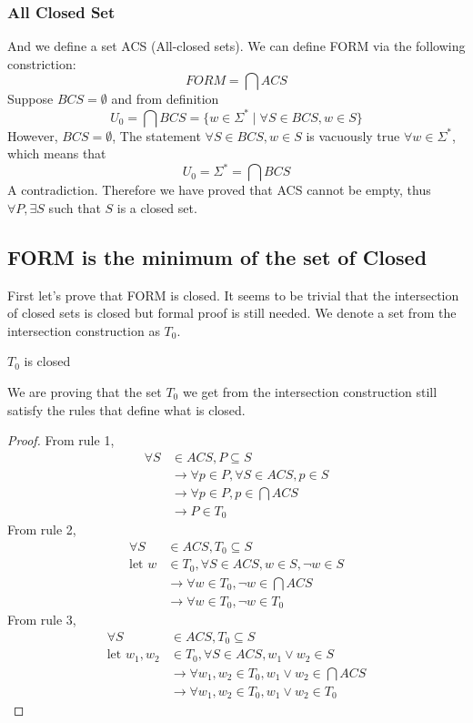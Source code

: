 \documentclass{article}
\newtheorem{lemma}[theorem]{Lemma}
\let\oldlemma\lemma
\let\endoldlemma\endlemma
\renewenvironment{lemma}
  {\begin{tcolorbox}[
      colback=green!8,
      colframe=green!50!black,
      boxrule=0.6pt,
      arc=2pt,
      left=6pt,right=6pt,top=4pt,bottom=4pt
    ]\oldlemma}
  {\endoldlemma\end{tcolorbox}}
\begin{document}
\subsubsection{All Closed Set}
And we define a set ACS (All-closed sets). We can define FORM via the following constriction:
\[FORM = \bigcap ACS\]
Suppose $BCS = \emptyset$ and from definition
\[U_0 = \bigcap BCS = \{w \in \Sigma^* \mid \forall S \in BCS, w \in S\}\]
However, $BCS = \emptyset$, The statement $\forall S \in BCS, w \in S$ is vacuously true $\forall w \in \Sigma^*$, which means that
\[U_0 = \Sigma^* = \bigcap BCS\]
A contradiction.
Therefore we have proved that ACS cannot be empty, thus $\forall P, \exists S$ such that $S$ is a closed set. 
\subsection{FORM is the minimum of the set of Closed}
First let's prove that FORM is closed. It seems to be trivial that the intersection of closed sets is closed but formal proof is still needed.
We denote a set from the intersection construction as $T_0$.
\begin{lemma}
    $T_0$ is closed 
\end{lemma}
We are proving that the set $T_0$ we get from the intersection construction still satisfy the rules that define what is closed. 
\begin{proof}
    From rule 1,
    \begin{align*}
        \forall S &\in ACS, P \subseteq S\\
        &\rightarrow \forall p \in P, \forall S \in ACS, p \in S \\
        &\rightarrow \forall p \in P, p \in \bigcap ACS\\
        &\rightarrow P \in T_0
    \end{align*}
    From rule 2, 
    \begin{align*}
        \forall S &\in ACS, T_0 \subseteq S\\
        \text{let } w &\in T_0, \forall S \in ACS, w \in S, \neg w \in S\\
        & \rightarrow \forall w \in T_0, \neg w \in \bigcap ACS\\
        & \rightarrow \forall w \in T_0, \neg w \in T_0
    \end{align*}
    From rule 3,
    \begin{align*}
        \forall S&\in ACS, T_0 \subseteq S\\
        \text{let } w_1, w_2 &\in T_0, \forall S \in ACS, w_1 \lor w_2 \in S\\
        & \rightarrow \forall w_1, w_2 \in T_0, w_1 \lor w_2 \in \bigcap ACS\\
        & \rightarrow \forall w_1, w_2 \in T_0, w_1 \lor w_2 \in T_0
    \end{align*}
\end{proof}
\end{document}
